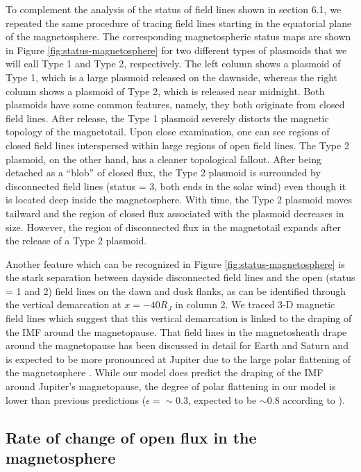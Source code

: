 To complement the analysis of the status of field lines shown in section 6.1, we repeated the same procedure of tracing field lines starting in the equatorial plane of the magnetosphere. The corresponding magnetospheric status maps are shown in Figure \ref{fig:status-magnetosphere} for two different types of plasmoids that we will call Type 1 and Type 2, respectively. The left column shows a plasmoid of Type 1, which is a large plasmoid released on the dawnside, whereas the right column shows a plasmoid of Type 2, which is released near midnight. Both plasmoids have some common features, namely, they both originate from closed field lines. After release, the Type 1 plasmoid severely distorts the magnetic topology of the magnetotail. Upon close examination, one can see regions of closed field lines interspersed within large regions of open field lines. The Type 2 plasmoid, on the other hand, has a cleaner topological fallout. After being detached as a “blob” of closed flux, the Type 2 plasmoid is surrounded by disconnected field lines (status = 3, both ends in the solar wind) even though it is located deep inside the magnetosphere. With time, the Type 2 plasmoid moves tailward and the region of closed flux associated with the plasmoid decreases in size. However, the region of disconnected flux in the magnetotail expands after the release of a Type 2 plasmoid. 

Another feature which can be recognized in Figure \ref{fig:status-magnetosphere} is the stark separation between dayside disconnected field lines and the open (status = 1 and 2) field lines on the dawn and dusk flanks, as can be identified through the vertical demarcation at $x = -40 R_J$ in column 2. We traced 3‐D magnetic field lines which suggest that this vertical demarcation is linked to the draping of the IMF around the magnetopause. That field lines in the magnetosheath drape around the magnetopause has been discussed in detail for Earth and Saturn \cite{Crooker1985,Sulaiman2014,Sulaiman2017Large-scaleMagnetosphere} and is expected to be more pronounced at Jupiter due to the large polar flattening of the magnetosphere \cite{Erkaev1996,Farrugia1998,Slavin1985}. While our model does predict the draping of the IMF around Jupiter's magnetopause, the degree of polar flattening in our model is lower than previous predictions ($\epsilon=\sim$0.3, expected to be $\sim$0.8 according to ). 

\subsection{Rate of change of open flux in the magnetosphere}

